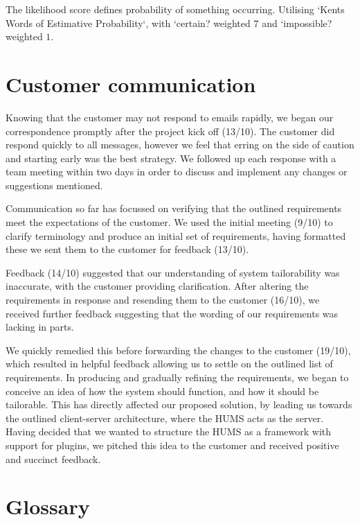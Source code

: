 \documentclass[10pt,a4paper]{article}
\begin{document}


The likelihood score defines probability of something occurring. Utilising `Kents Words of Estimative Probability\cite{kent1966strategic}`, with `certain? weighted $7$ and `impossible? weighted $1$.





\section{Customer communication}

Knowing that the customer may not respond to emails rapidly, we began our
correspondence promptly after the project kick off (13/10). The customer did
respond quickly to all messages, however we feel that erring on the side of
caution and starting early was the best strategy. We followed up each response
with a team meeting within two days in order to discuss and implement any
changes or suggestions mentioned.

Communication so far has focussed on verifying that the outlined requirements
meet the expectations of the customer. We used the initial meeting (9/10) to
clarify terminology and produce an initial set of requirements,  having
formatted these we sent them to the customer for feedback (13/10).

Feedback (14/10) suggested that our understanding of system tailorability was
inaccurate, with the customer providing clarification. After altering the
requirements in response and resending them to the customer (16/10), we received
further feedback suggesting that the wording of our requirements was lacking in
parts.

We quickly remedied this before forwarding the changes to the customer (19/10),
which resulted in helpful feedback allowing us to settle on the outlined list
of requirements. In producing and gradually refining the requirements, we began
to conceive an idea of how the system should function, and how it should be
tailorable. This has directly affected our proposed solution, by leading us
towards the outlined client-server architecture, where the HUMS acts as the
server. Having decided that we wanted to structure the HUMS as a framework with
support for plugins, we pitched this idea to the customer and received positive
and succinct feedback.


\section{Glossary}
\end{document}
